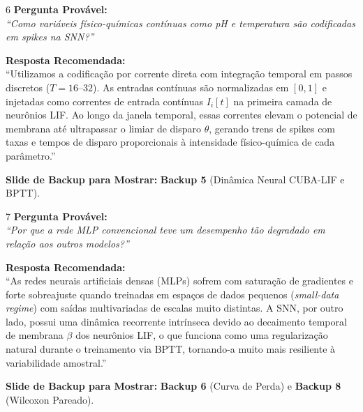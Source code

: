 \documentclass[11pt,a4paper]{article}
\begin{document}
\begin{qnabox}{6}
\textbf{Pergunta Provável:}\\
\textit{``Como variáveis físico-químicas contínuas como pH e temperatura são codificadas em spikes na SNN?''}

\vspace{0.2cm}
\textbf{Resposta Recomendada:}\\
``Utilizamos a codificação por corrente direta com integração temporal em passos discretos ($T=16\text{--}32$). As entradas contínuas são normalizadas em $[0, 1]$ e injetadas como correntes de entrada contínuas $I_i[t]$ na primeira camada de neurônios LIF. Ao longo da janela temporal, essas correntes elevam o potencial de membrana até ultrapassar o limiar de disparo $\theta$, gerando trens de spikes com taxas e tempos de disparo proporcionais à intensidade físico-química de cada parâmetro.''

\vspace{0.2cm}
\textbf{Slide de Backup para Mostrar:} \textbf{Backup 5} (Dinâmica Neural CUBA-LIF e BPTT).
\end{qnabox}

\begin{qnabox}[Por que a MLP clássica falhou com $R^2 = -5{,}46$?]{7}
\textbf{Pergunta Provável:}\\
\textit{``Por que a rede MLP convencional teve um desempenho tão degradado em relação aos outros modelos?''}

\vspace{0.2cm}
\textbf{Resposta Recomendada:}\\
``As redes neurais artificiais densas (MLPs) sofrem com saturação de gradientes e forte sobreajuste quando treinadas em espaços de dados pequenos (\textit{small-data regime}) com saídas multivariadas de escalas muito distintas. A SNN, por outro lado, possui uma dinâmica recorrente intrínseca devido ao decaimento temporal de membrana $\beta$ dos neurônios LIF, o que funciona como uma regularização natural durante o treinamento via BPTT, tornando-a muito mais resiliente à variabilidade amostral.''

\vspace{0.2cm}
\textbf{Slide de Backup para Mostrar:} \textbf{Backup 6} (Curva de Perda) e \textbf{Backup 8} (Wilcoxon Pareado).
\end{qnabox}
\end{document}

